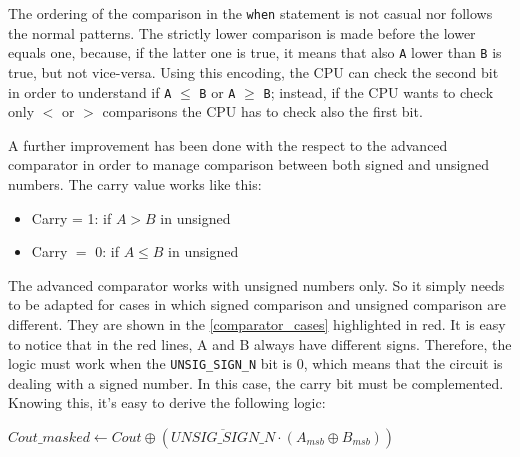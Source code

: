  The ordering of the comparison in the \texttt{when} statement is not casual nor follows the normal patterns. The strictly lower comparison is made before the lower equals one, because, if the latter one is true, it means that also \texttt{A} lower than \texttt{B} is true, but not vice-versa. Using this encoding, the CPU can check the second bit in order to understand if \texttt{A} $\leq$ \texttt{B} or \texttt{A} $\geq$ \texttt{B}; instead, if the CPU wants to check only $<$ or $>$ comparisons the CPU has to check also the first bit.

 

A further improvement has been done with the respect to the advanced comparator in order to manage comparison between both signed and unsigned numbers. The carry value works like this:
\begin{itemize}
  \item Carry = 1: if \(A > B\) in unsigned
  \item Carry \(=\) 0: if \(A \leq B\) in unsigned
\end{itemize}

The advanced comparator works with unsigned numbers only. So it simply needs to be adapted for cases in which signed comparison and unsigned comparison are different. They are shown in the \autoref{comparator_cases} highlighted in red. 
It is easy to notice that in the red lines, A and B always have different signs. Therefore, the logic must work when the \texttt{UNSIG\_SIGN\_N} bit is 0, which means that the circuit is dealing with a signed number. In this case, the carry bit must be complemented. Knowing this, it's easy to derive the following logic:

\begin{center}
	$Cout\_masked \leftarrow Cout \oplus (\overline{UNSIG\_SIGN\_N} \cdot (A_{msb} \oplus B_{msb}))$
\end{center}


